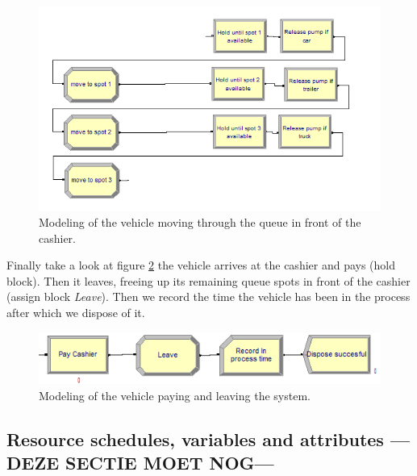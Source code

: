 \begin{figure}[]
\begin{center}
	\includegraphics[scale=1]{images/model-description/cashier-queue.PNG}
	\caption{Modeling of the vehicle moving through the queue in front of the cashier.}
	\label{fig:cashierqueue}
\end{center}
\end{figure}

Finally take a look at figure \ref{fig:payleave} the vehicle arrives at the cashier and pays (hold block). Then it leaves, freeing up its remaining queue spots in front of the cashier (assign block \textit{Leave}). Then we record the time the vehicle has been in the process after which we dispose of it.

\begin{figure}[]
\begin{center}
	\includegraphics[scale=1]{images/model-description/pay-and-leave.PNG}
	\caption{Modeling of the vehicle paying and leaving the system.}
	\label{fig:payleave}
\end{center}
\end{figure}

\subsection{Resource schedules, variables and attributes ---DEZE SECTIE MOET NOG---}\label{app:resources}